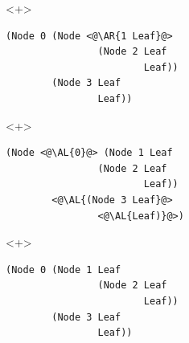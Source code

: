 \begin{frame}[fragile]
\begin{itemize}[<+->]
\begin{itemize}
\begin{onlyenv}<+>
\begin{lstlisting}
(Node 0 (Node <@\AR{1 Leaf}@>
                (Node 2 Leaf
                        Leaf))
        (Node 3 Leaf
                Leaf))
\end{lstlisting}
\end{onlyenv}

\begin{onlyenv}<+>
\begin{lstlisting}
(Node <@\AL{0}@> (Node 1 Leaf
                (Node 2 Leaf
                        Leaf))
        <@\AL{(Node 3 Leaf}@>
                <@\AL{Leaf)}@>)
\end{lstlisting}
\end{onlyenv}

\begin{onlyenv}<+>
\color{gray}
\begin{lstlisting}
(Node 0 (Node 1 Leaf
                (Node 2 Leaf
                        Leaf))
        (Node 3 Leaf
                Leaf))
\end{lstlisting}
\end{onlyenv}
\end{itemize}

\end{itemize}
\end{frame}

